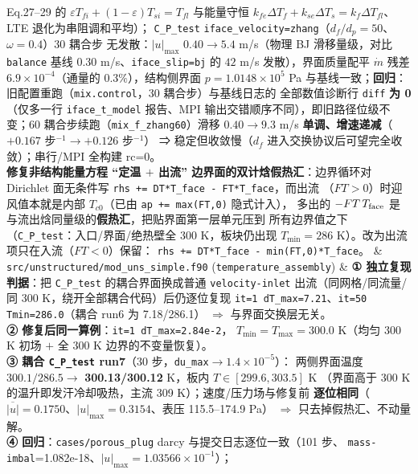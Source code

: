 {\begin{longtable}
Eq.27--29 的 $\varepsilon T_{fi}+(1-\varepsilon)T_{si}=T_{fl}$ 与能量守恒
$k_{fe}\Delta T_f+k_{se}\Delta T_s=k_f\Delta T_{fl}$、LTE 退化为串阻调和平均）；
\texttt{C\_P\_test} \texttt{iface\_velocity=zhang}（$d_f/d_p=50$、$\omega=0.4$）30 耦合步
无发散：$|u|_{\max}$ $0.40\to5.4$ m/s（物理 BJ 滑移量级，对比 \texttt{balance} 基线
$0.30$ m/s、\texttt{iface\_slip=bj} 的 $42$ m/s 发散），界面质量配平
$\dot m$ 残差 $6.9\times10^{-4}$（通量的 $0.3\%$），结构侧界面 $p=1.0148\times10^5$ Pa
与基线一致；\textbf{回归}：旧配置重跑（\texttt{mix.control}，30 耦合步）与基线日志的
全部数值诊断行 \texttt{diff} \textbf{为 0}（仅多一行 \texttt{iface\_t\_model} 报告、MPI
输出交错顺序不同），即旧路径位级不变；60 耦合步续跑（\texttt{mix\_f\_zhang60}）滑移
$0.40\to9.3$ m/s \textbf{单调、增速递减}（$+0.167$ 步$^{-1}$$\to$$+0.126$ 步$^{-1}$）
⇒ 稳定但收敛慢（$d_f$ 进入交换协议后可望完全收敛）；串行/MPI 全构建 rc=0。 \\
\textbf{修复非结构能量方程 ``定温 $+$ 出流'' 边界面的双计焓假热汇}：边界循环对
Dirichlet 面无条件写 \texttt{rhs += DT*T\_face - FT*T\_face}，而出流
（$FT>0$）时迎风值本就是内部 $T_{c0}$（已由 \texttt{ap += max(FT,0)} 隐式计入），
多出的 $-FT\,T_{\rm face}$ 是与流出焓同量级的\textbf{假热汇}，把贴界面第一层单元压到
所有边界值之下（\texttt{C\_P\_test}：入口/界面/绝热壁全 300 K，板块仍出现
$T_{\min}=286$ K）。改为出流项只在入流（$FT<0$）保留：
\texttt{rhs += DT*T\_face - min(FT,0)*T\_face}。 &
\texttt{src/unstructured/mod\_uns\_simple.f90}\newline
(\texttt{temperature\_assembly}) &
\textbf{① 独立复现判据}：把 \texttt{C\_P\_test} 的耦合界面换成普通
\texttt{velocity-inlet} 出流（同网格/同流量/同 300 K，绕开全部耦合代码）后仍逐位复现
\texttt{it=1 dT\_max=7.21}、\texttt{it=50 Tmin=286.0}（耦合 run6 为 7.18/286.1）
$\Rightarrow$ 与界面交换层无关。\\
\textbf{② 修复后同一算例}：\texttt{it=1 dT\_max=2.84e-2}，
$T_{\min}=T_{\max}=300.0$ K（均匀 300 K 初场 $+$ 全 300 K 边界的不变量恢复）。\\
\textbf{③ 耦合 \texttt{C\_P\_test} run7}（30 步，\texttt{du\_max}$\to1.4\times10^{-5}$）：
两侧界面温度 $300.1/286.5\to$ \textbf{300.13/300.12} K，板内 $T\in[299.6,303.5]$ K
（界面高于 300 K 的温升即发汗冷却吸热，主流 309 K）；速度/压力场与修复前
\textbf{逐位相同}（$\overline{|u|}=0.1750$、$|u|_{\max}=0.3154$、表压 115.5--174.9 Pa）
$\Rightarrow$ 只去掉假热汇、不动量解。\\
\textbf{④ 回归}：\texttt{cases/porous\_plug} darcy 与提交日志逐位一致（101 步、
\texttt{mass-imbal}=1.082e-18、$|u|_{\max}=1.03566\times10^{-1}$）；

\end{longtable}}
